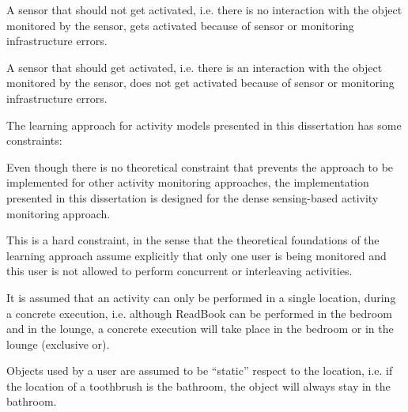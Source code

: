 \begin{defn}
\label{def-positive}
 A sensor that should not get activated, i.e. there is no interaction with the object monitored by the sensor, gets activated because of sensor or monitoring infrastructure errors.
\end{defn}

\begin{defn}
\label{def-missing}
 A sensor that should get activated, i.e. there is an interaction with the object monitored by the sensor, does not get activated because of sensor or monitoring infrastructure errors.
\end{defn}



The learning approach for activity models presented in this dissertation has some constraints:

\begin{cons}
\label{cons-dense}
 Even though there is no theoretical constraint that prevents the approach to be implemented for other activity monitoring approaches, the implementation presented in this dissertation is designed for the dense sensing-based activity monitoring approach.
\end{cons}

\begin{cons}
\label{cons-single}
 This is a hard constraint, in the sense that the theoretical foundations of the learning approach assume explicitly that only one user is being monitored and this user is not allowed to perform concurrent or interleaving activities.
\end{cons}

\begin{cons}
\label{cons-location}
 It is assumed that an activity can only be performed in a single location, during a concrete execution, i.e. although ReadBook can be performed in the bedroom and in the lounge, a concrete execution will take place in the bedroom or in the lounge (exclusive or).
\end{cons}

\begin{cons}
\label{cons-static-obj}
 Objects used by a user are assumed to be ``static'' respect to the location, i.e. if the location of a toothbrush is the bathroom, the object will always stay in the bathroom.
\end{cons}
